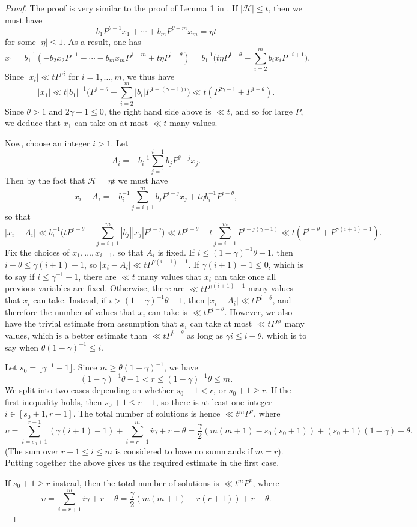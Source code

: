 \documentclass[11pt,reqno]{amsart}
\numberwithin{equation}{section}
\begin{document}
\begin{proof} The proof is very similar to the proof of Lemma 1 in \cite{ArkhZhit}. If $|\mathcal{H}| \leq t$, then we must have 
\[ b_1P^{\theta-1}x_1+\cdots+b_mP^{\theta-m}x_m = \eta t \]
for some $|\eta| \leq 1$. 
As a result, one has 
\[ x_1 = b_1^{-1}(-b_2x_2P^{-1}-\cdots-b_mx_mP^{1-m}+t\eta P^{1-\theta}) = b_1^{-1} \Big( t\eta P^{1-\theta} - \sum_{i=2}^m b_ix_iP^{-i+1} \Big). \]
Since $|x_i| \ll tP^{\gamma i}$ for $i = 1, \ldots, m$, we thus have 
\[ |x_1| \ll t|b_1|^{-1} \Big( P^{1-\theta} + \sum_{i=2}^m |b_i|P^{1+(\gamma-1)i} \Big) \ll t(P^{2\gamma-1}+P^{1-\theta}). \]
Since $\theta > 1$ and $2\gamma -1 \leq 0$, the right hand side above is $\ll t$, and so for large $P$, we deduce that $x_1$ can take on at most $\ll t$ many values. 

Now, choose an integer $i > 1$. Let 
\[ A_i = -b_i^{-1}\sum_{j = 1}^{i-1} b_jP^{\theta-j}x_j. \]
Then by the fact that $\mathcal{H} = \eta t$ we must have 
\[ x_i - A_i = -b_i^{-1}\sum_{j=i+1}^m b_jP^{i-j}x_j +t\eta b_i^{-1}P^{i-\theta}, \]
so that 
\[ |x_i - A_i| \ll b_i^{-1}\Big( tP^{i-\theta} + \sum_{j=i+1}^m |b_j||x_j|P^{i-j} \Big) \ll tP^{i-\theta} + t\sum_{j=i+1}^m P^{i-j(\gamma-1)} \ll t(P^{i-\theta}+P^{\gamma(i+1)-1}). \]
Fix the choices of $x_1, \ldots, x_{i-1}$, so that $A_i$ is fixed. If $i \leq (1-\gamma)^{-1}\theta -1$, then $i- \theta \leq \gamma(i+1)-1$, so $|x_i -A_i| \ll tP^{\gamma(i+1)-1}$. If $\gamma(i+1)-1 \leq 0$, which is to say if $i \leq \gamma^{-1}-1$, there are $\ll t$ many values that $x_i$ can take once all previous variables are fixed. Otherwise, there are $\ll tP^{\gamma(i+1)-1}$ many values that $x_i$ can take. Instead, if $i > (1-\gamma)^{-1}\theta-1$, then $|x_i-A_i| \ll tP^{i-\theta} $, and therefore the number of values that $x_i$ can take is $\ll tP^{i-\theta}$. However, we also have the trivial estimate from assumption that $x_i$ can take at most $\ll tP^{\gamma i}$ many values, which is a better estimate than $\ll tP^{i-\theta}$ as long as $\gamma i \leq i-\theta$, which is to say when $\theta(1-\gamma)^{-1} \leq i$. 

Let $s_0 = \lfloor \gamma^{-1}-1\rfloor $. Since $m \geq \theta (1-\gamma)^{-1}$, we have 
\[ (1-\gamma)^{-1}\theta-1 < r \leq (1-\gamma)^{-1}\theta \leq m.\] 
We split into two cases depending on whether 
$s_0+1 < r$, or $s_0 +1 \geq r$. 
If the first inequality holds, then $s_0+1 \leq r-1$, so there is at least one integer $i \in [s_0+1,r-1]$. 
The total number of solutions is hence $\ll t^m P^{\upsilon}$, where 
\[ \upsilon = \sum_{i = s_0+1 }^{r-1} (\gamma(i+1)-1)+\sum_{i = r+1}^m i\gamma + r-\theta = \frac{\gamma}{2}( m(m+1)- s_0(s_0+1))+(s_0+1)(1-\gamma)- \theta. \]
(The sum over $r+1 \leq i \leq m$ is considered to have no summands if $m=r$). Putting together the above gives us the required estimate in the first case. 

If $s_0 +1 \geq r$ instead, then the total number of solutions is $\ll t^mP^{\upsilon}$, where 
\[ \upsilon = \sum_{i = r+1}^m i\gamma + r-\theta = \frac{\gamma}{2}( m(m+1)- r(r+1))+r- \theta. \]
\end{proof}
\end{document}
